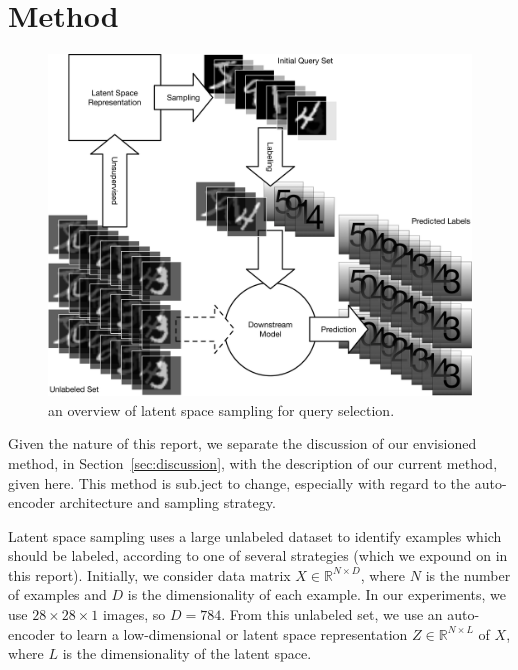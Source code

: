 \documentclass[a4paper]{article}
\begin{document}
\section{Method}
\label{sec:method}

\begin{figure}
  \centering
  \includegraphics[width=\linewidth]{docs/query_selection}
  \caption{an overview of latent space sampling for query selection.}
  \label{fig:overview}
\end{figure}

Given the nature of this report, we separate the discussion of our envisioned
method, in Section~\ref{sec:discussion}, with the description of our current
method, given here. This method is sub.ject to change, especially with regard to
the auto-encoder architecture and sampling strategy.

Latent space sampling uses a large unlabeled dataset to identify examples which
should be labeled, according to one of several strategies (which we expound on
in this report). Initially, we consider data matrix
$X \in \mathbb{R}^{N\times D}$, where $N$ is the number of examples and $D$ is
the dimensionality of each example. In our experiments, we use
$28 \times 28 \times 1$ images, so $D = 784$. From this unlabeled set, we use an
auto-encoder to learn a low-dimensional or latent space representation
$Z \in \mathbb{R}^{N\times L}$ of $X$, where $L$ is the dimensionality of the
latent space.
\end{document}
